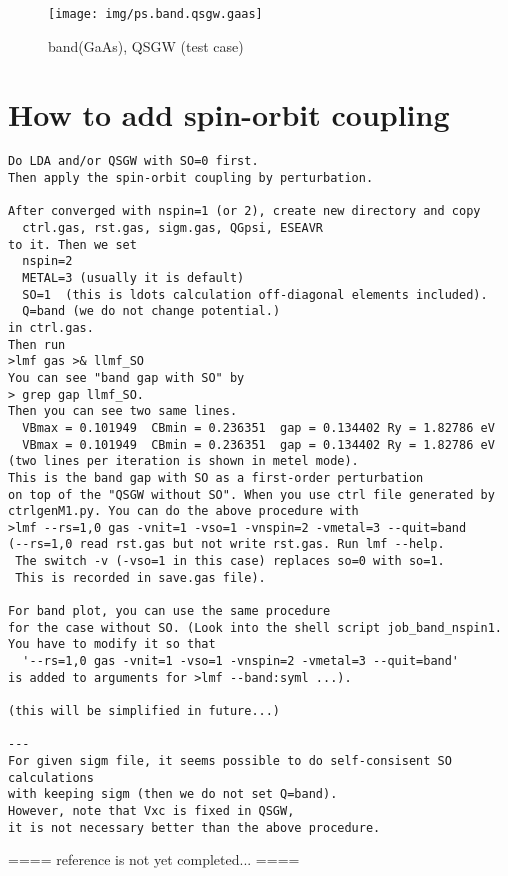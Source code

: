\documentclass[a4paper,10pt,epsf,fleqn]{article}
\begin{document}
\begin{figure}[hbtp]
  \texttt{[image: img/ps.band.qsgw.gaas]}
  \caption{band(GaAs), QSGW (test case)}
\end{figure}



\section{How to add spin-orbit coupling}
\begin{verbatim}
Do LDA and/or QSGW with SO=0 first.
Then apply the spin-orbit coupling by perturbation.

After converged with nspin=1 (or 2), create new directory and copy
  ctrl.gas, rst.gas, sigm.gas, QGpsi, ESEAVR
to it. Then we set
  nspin=2 
  METAL=3 (usually it is default)
  SO=1  (this is ldots calculation off-diagonal elements included).
  Q=band (we do not change potential.)
in ctrl.gas. 
Then run
>lmf gas >& llmf_SO
You can see "band gap with SO" by 
> grep gap llmf_SO.
Then you can see two same lines.
  VBmax = 0.101949  CBmin = 0.236351  gap = 0.134402 Ry = 1.82786 eV
  VBmax = 0.101949  CBmin = 0.236351  gap = 0.134402 Ry = 1.82786 eV
(two lines per iteration is shown in metel mode).
This is the band gap with SO as a first-order perturbation 
on top of the "QSGW without SO". When you use ctrl file generated by
ctrlgenM1.py. You can do the above procedure with
>lmf --rs=1,0 gas -vnit=1 -vso=1 -vnspin=2 -vmetal=3 --quit=band
(--rs=1,0 read rst.gas but not write rst.gas. Run lmf --help.
 The switch -v (-vso=1 in this case) replaces so=0 with so=1. 
 This is recorded in save.gas file).

For band plot, you can use the same procedure 
for the case without SO. (Look into the shell script job_band_nspin1.
You have to modify it so that 
  '--rs=1,0 gas -vnit=1 -vso=1 -vnspin=2 -vmetal=3 --quit=band' 
is added to arguments for >lmf --band:syml ...).

(this will be simplified in future...)

---
For given sigm file, it seems possible to do self-consisent SO calculations
with keeping sigm (then we do not set Q=band). 
However, note that Vxc is fixed in QSGW, 
it is not necessary better than the above procedure.
\end{verbatim}




==== reference is not yet completed... ====
\end{document}
